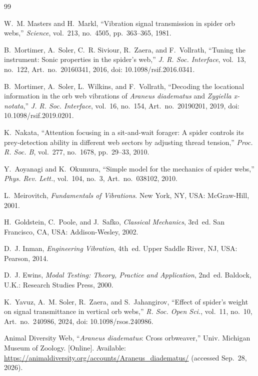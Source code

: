 \documentclass[11pt,letterpaper]{article}
\begin{document}
\begin{thebibliography}{99}

W.~M. Masters and H.~Markl, ``Vibration signal transmission in spider orb
webs,'' \textit{Science}, vol.~213, no.~4505, pp.~363--365, 1981.

B.~Mortimer, A.~Soler, C.~R. Siviour, R.~Zaera, and F.~Vollrath,
``Tuning the instrument: Sonic properties in the spider's web,''
\textit{J. R. Soc. Interface}, vol.~13, no.~122, Art.~no.~20160341, 2016,
doi: 10.1098/rsif.2016.0341.

B.~Mortimer, A.~Soler, L.~Wilkins, and F.~Vollrath, ``Decoding the
locational information in the orb web vibrations of \textit{Araneus
diadematus} and \textit{Zygiella x-notata},'' \textit{J. R. Soc. Interface},
vol.~16, no.~154, Art.~no.~20190201, 2019, doi: 10.1098/rsif.2019.0201.

K.~Nakata, ``Attention focusing in a sit-and-wait forager: A spider controls
its prey-detection ability in different web sectors by adjusting thread
tension,'' \textit{Proc. R. Soc. B}, vol.~277, no.~1678, pp.~29--33, 2010.

Y.~Aoyanagi and K.~Okumura, ``Simple model for the mechanics of spider
webs,'' \textit{Phys. Rev. Lett.}, vol.~104, no.~3, Art.~no.~038102, 2010.

L.~Meirovitch, \textit{Fundamentals of Vibrations}.
New York, NY, USA: McGraw-Hill, 2001.

H.~Goldstein, C.~Poole, and J.~Safko, \textit{Classical Mechanics}, 3rd~ed.
San Francisco, CA, USA: Addison-Wesley, 2002.

D.~J. Inman, \textit{Engineering Vibration}, 4th~ed.
Upper Saddle River, NJ, USA: Pearson, 2014.

D.~J. Ewins, \textit{Modal Testing: Theory, Practice and Application}, 2nd~ed.
Baldock, U.K.: Research Studies Press, 2000.

K.~Yavuz, A.~M. Soler, R.~Zaera, and S.~Jahangirov,
``Effect of spider's weight on signal transmittance in vertical orb webs,''
\textit{R. Soc. Open Sci.}, vol.~11, no.~10, Art.~no.~240986, 2024,
doi: 10.1098/rsos.240986.

Animal Diversity Web, ``\textit{Araneus diadematus}: Cross orbweaver,''
Univ. Michigan Museum of Zoology. [Online]. Available:
\url{https://animaldiversity.org/accounts/Araneus_diadematus/}
(accessed Sep.~28, 2026).


\end{thebibliography}
\end{document}
